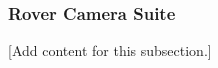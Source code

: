 
\subsubsection{Rover Camera Suite}
\label{subsubsec:design_6_5_rover_camera_suite}

[Add content for this subsection.]
